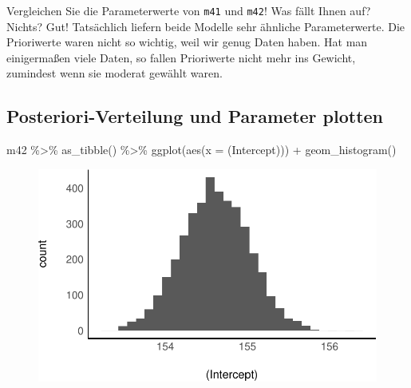 \documentclass[
  a4paper,
  DIV=11]{scrreprt}
\newenvironment{Shaded}{\begin{snugshade}}{\end{snugshade}}
\newcommand{\AttributeTok}[1]{\textcolor[rgb]{0.40,0.45,0.13}{#1}}
\newcommand{\FunctionTok}[1]{\textcolor[rgb]{0.28,0.35,0.67}{#1}}
\newcommand{\NormalTok}[1]{\textcolor[rgb]{0.00,0.23,0.31}{#1}}
\newcommand{\SpecialCharTok}[1]{\textcolor[rgb]{0.37,0.37,0.37}{#1}}
\newcommand{\StringTok}[1]{\textcolor[rgb]{0.13,0.47,0.30}{#1}}
\theoremstyle{definition}
\theoremstyle{remark}
\begin{document}
\begin{tcolorbox}[enhanced jigsaw, leftrule=.75mm, toptitle=1mm, bottomtitle=1mm, titlerule=0mm, breakable, colframe=quarto-callout-important-color-frame, title=\textcolor{quarto-callout-important-color}{\faExclamation}\hspace{0.5em}{Wichtig}, rightrule=.15mm, colback=white, arc=.35mm, left=2mm, bottomrule=.15mm, coltitle=black, opacitybacktitle=0.6, toprule=.15mm, colbacktitle=quarto-callout-important-color!10!white, opacityback=0]
Vergleichen Sie die Parameterwerte von \texttt{m41} und \texttt{m42}!
Was fällt Ihnen auf? Nichts? Gut! Tatsächlich liefern beide Modelle sehr
ähnliche Parameterwerte. Die Prioriwerte waren nicht so wichtig, weil
wir genug Daten haben. Hat man einigermaßen viele Daten, so fallen
Prioriwerte nicht mehr ins Gewicht, zumindest wenn sie moderat gewählt
waren.
\end{tcolorbox}

\hypertarget{posteriori-verteilung-und-parameter-plotten}{%
\subsection{Posteriori-Verteilung und Parameter
plotten}\label{posteriori-verteilung-und-parameter-plotten}}

\begin{Shaded}
\begin{Highlighting}[]
\NormalTok{m42 }\SpecialCharTok{\%\textgreater{}\%} 
  \FunctionTok{as\_tibble}\NormalTok{() }\SpecialCharTok{\%\textgreater{}\%} 
  \FunctionTok{ggplot}\NormalTok{(}\FunctionTok{aes}\NormalTok{(}\AttributeTok{x =} \StringTok{\textasciigrave{}}\AttributeTok{(Intercept)}\StringTok{\textasciigrave{}}\NormalTok{)) }\SpecialCharTok{+}
  \FunctionTok{geom\_histogram}\NormalTok{()}
\end{Highlighting}
\end{Shaded}

\begin{figure}[H]

{\centering \includegraphics{./gauss_files/figure-pdf/unnamed-chunk-7-1.pdf}

}

\end{figure}
\end{document}
